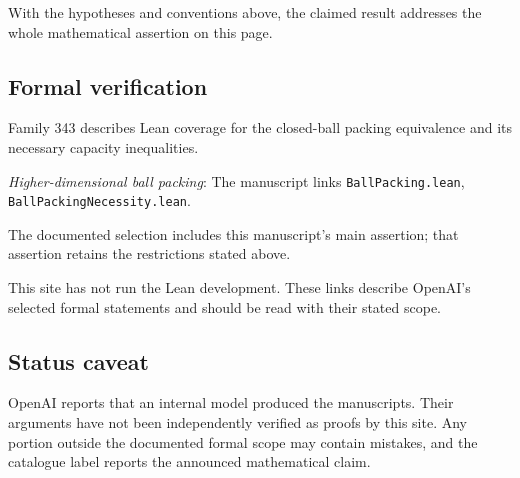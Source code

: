 \documentclass[11pt]{article}
\begin{document}
With the hypotheses and conventions above, the claimed result addresses the whole mathematical assertion on this page.

\subsection{Formal verification}
Family 343 describes Lean coverage for the closed-ball packing equivalence and its necessary capacity inequalities.

\textit{Higher-dimensional ball packing}: The manuscript links \texttt{BallPacking.lean}, \texttt{BallPackingNecessity.lean}.

The documented selection includes this manuscript’s main assertion; that assertion retains the restrictions stated above.

This site has not run the Lean development. These links describe OpenAI’s selected formal statements and should be read with their stated scope.

\subsection{Status caveat}
OpenAI reports that an internal model produced the manuscripts. Their arguments have not been independently verified as proofs by this site. Any portion outside the documented formal scope may contain mistakes, and the catalogue label reports the announced mathematical claim.
\end{document}
